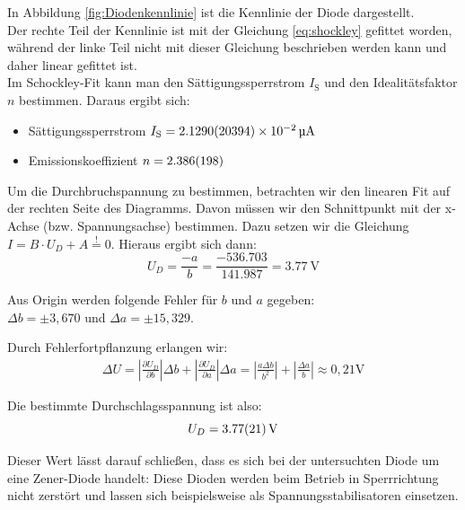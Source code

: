\documentclass[12pt,a4paper,ngerman]{report}
\begin{document}
		In Abbildung \ref{fig:Diodenkennlinie} ist die Kennlinie der Diode dargestellt. \\ 
		Der rechte Teil der Kennlinie ist mit der Gleichung \ref{eq:shockley} gefittet worden, während der linke Teil nicht mit dieser Gleichung beschrieben werden kann und daher linear gefittet ist. \\

		Im Schockley-Fit kann man den Sättigungssperrstrom $I_\text{S}$ und den Idealitätsfaktor $n$ bestimmen. Daraus ergibt sich:
		\begin{itemize}
			\item Sättigungssperrstrom $I_\text{S} = \SI{2.129 +- 2.0394 e-2}{\micro\ampere}$
			\item Emissionskoeffizient $n = \num{2.386 +- 0.198} $
		\end{itemize}

		Um die Durchbruchspannung zu bestimmen, betrachten wir den linearen Fit auf der rechten Seite des Diagramms. Davon müssen wir den Schnittpunkt mit der x-Achse (bzw. Spannungsachse) bestimmen.
		Dazu setzen wir die Gleichung\\
		$I=B \cdot U_D + A \stackrel{!}{=} 0$. Hieraus ergibt sich dann:
		$$U_D = \frac{-a}{b}  = \frac{-536.703}{141.987} = \qty{3.77}{\volt}$$

		Aus Origin werden folgende Fehler für $b$ und $a$ gegeben:\\ $\Delta b = \pm 3,670 $ und $\Delta a = \pm 15,329$.

		Durch Fehlerfortpflanzung erlangen wir:
		\begin{eqnarray}
			\Delta U =\left|\frac{\partial U_D}{\partial b}\right| \Delta b + \left|\frac{\partial U_D}{\partial a}\right|\Delta a = \left|\frac{a\Delta b}{b^2}\right|  + \left|\frac{\Delta a}{b}\right| \approx 0,21 \mathrm{V}
		\end{eqnarray}


		Die bestimmte Durchschlagsspannung ist also:
			\[ U_D = \qty{3.77 +- 0.21}{\volt}\]

		Dieser Wert lässt darauf schließen, dass es sich bei der untersuchten Diode um eine Zener-Diode handelt: Diese Dioden werden beim Betrieb in Sperrrichtung nicht zerstört und
		lassen sich beispielsweise als Spannungsstabilisatoren einsetzen.

		
\end{document}
